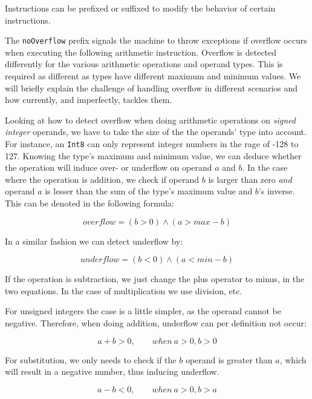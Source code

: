 Instructions can be prefixed or suffixed to modify the behavior of certain
instructions.

The {\tt noOverflow} prefix signals the machine to throw exceptions if overflow
occurs when executing the following arithmetic instruction. Overflow is detected
differently for the various arithmetic operations and operand types. This is
required as different as types have different maximum and minimum values. We
will briefly explain the challenge of handling overflow in different scenarios
and how \thename{} currently, and imperfectly, tackles them.

Looking at how to detect overflow when doing arithmetic operations on {\em
  signed integer} operands, we have to take the size of the the operands' type
into account. For instance, an {\tt Int8} can only represent integer numbers in
the rage of -128 to 127. Knowing the type's maximum and minimum value, we can
deduce whether the operation will induce over- or underflow on operand $a$ and
$b$. In the case where the operation is addition, we check if operand $b$ is
larger than zero {\em and} operand $a$ is lesser than the sum of the type's
maximum value and $b$'s inverse. This can be denoted in the following formula:

\label{eq:overflow}
\begin{equation}
  overflow = (b > 0) \wedge (a > max - b)
\end{equation}

In a similar fashion we can detect underflow by:

\begin{equation}
  underflow = (b < 0) \wedge (a < min - b)
\end{equation}

If the operation is subtraction, we just change the plus operator to minus, in
the two equations. In the case of multiplication we use division, etc.

For unsigned integers the case is a little simpler, as the operand cannot be
negative. Therefore, when doing addition, underflow can per definition not
occur:

\begin{equation}
  a + b > 0, \qquad when\ a > 0, b > 0
\end{equation}

For substitution, we only needs to check if the $b$ operand is greater
than $a$, which will result in a negative number, thus inducing underflow.

\begin{equation}
  a - b < 0, \qquad when\ a > 0, b > a
\end{equation}

